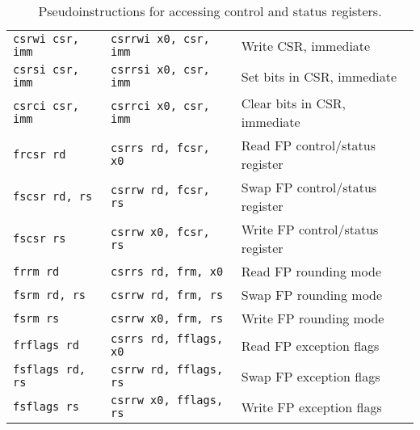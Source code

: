 \begin{table}[h]
\begin{small}
\begin{center}
\begin{tabular}{l l l}
\hline
{\tt csrwi csr, imm} & {\tt csrrwi x0, csr, imm} & Write CSR, immediate \\
{\tt csrsi csr, imm} & {\tt csrrsi x0, csr, imm} & Set bits in CSR, immediate \\
{\tt csrci csr, imm} & {\tt csrrci x0, csr, imm} & Clear bits in CSR, immediate \\
\hline
{\tt frcsr rd} & {\tt csrrs rd, fcsr, x0} & Read FP control/status register \\
{\tt fscsr rd, rs} & {\tt csrrw rd, fcsr, rs} & Swap FP control/status register \\
{\tt fscsr rs} & {\tt csrrw x0, fcsr, rs} & Write FP control/status register \\
\hline
{\tt frrm rd} & {\tt csrrs rd, frm, x0} & Read FP rounding mode \\
{\tt fsrm rd, rs} & {\tt csrrw rd, frm, rs} & Swap FP rounding mode \\
{\tt fsrm rs} & {\tt csrrw x0, frm, rs} & Write FP rounding mode \\
\hline
{\tt frflags rd} & {\tt csrrs rd, fflags, x0} & Read FP exception flags \\
{\tt fsflags rd, rs} & {\tt csrrw rd, fflags, rs} & Swap FP exception flags \\
{\tt fsflags rs} & {\tt csrrw x0, fflags, rs} & Write FP exception flags \\
\hline

\end{tabular}
\end{center}
\end{small}
\caption{Pseudoinstructions for accessing control and status registers.}
\label{csr-pseudos}
\end{table}
